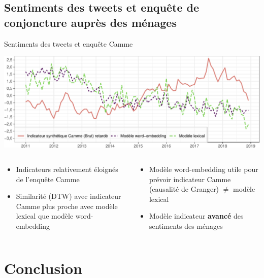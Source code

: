 \documentclass[10pt,xcolor=table,color={dvipsnames,usenames},ignorenonframetext,usepdftitle=false,french]{beamer}
\begin{document}
\hypertarget{sentiments-des-tweets-et-enquuxeate-de-conjoncture-aupruxe8s-des-muxe9nages}{%
\subsection{Sentiments des tweets et enquête de conjoncture auprès des
ménages}\label{sentiments-des-tweets-et-enquuxeate-de-conjoncture-aupruxe8s-des-muxe9nages}}

\begin{frame}{Sentiments des tweets et enquête Camme}
\protect\hypertarget{sentiments-des-tweets-et-enquuxeate-camme}{}

\centering\includegraphics[width =\textwidth]{img/rmd-graphSentiments-1}

\raggedright  \pause
\begin{columns}
\begin{column}{0.5\textwidth} \bcsmmh
\begin{itemize}
\item Indicateurs relativement éloignés de l'enquête Camme
\item Similarité (DTW) avec indicateur Camme plus proche avec modèle lexical que modèle word-embedding 
\end{itemize}

\end{column}\pause
\begin{column}{0.5\textwidth} \bcsmbh
\begin{itemize}
\item Modèle word-embedding utile pour prévoir indicateur Camme (causalité de Granger) $\ne$ modèle lexical
\item Modèle indicateur \textbf{avancé} des sentiments des ménages
\end{itemize}

\end{column}
\end{columns}

\end{frame}

\hypertarget{conclusion}{%
\section*{Conclusion}\label{conclusion}}
\end{document}
